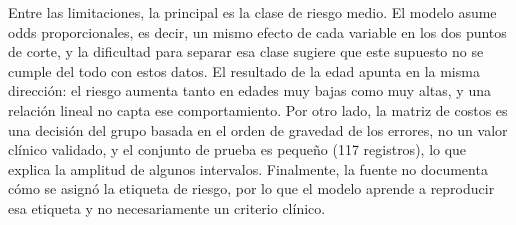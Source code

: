 Entre las limitaciones, la principal es la clase de riesgo medio. El modelo
asume odds proporcionales, es decir, un mismo efecto de cada variable en los
dos puntos de corte, y la dificultad para separar esa clase sugiere que este
supuesto no se cumple del todo con estos datos. El resultado de la edad apunta
en la misma dirección: el riesgo aumenta tanto en edades muy bajas como muy
altas, y una relación lineal no capta ese comportamiento. Por otro lado, la
matriz de costos es una decisión del grupo basada en el orden de gravedad de los
errores, no un valor clínico validado, y el conjunto de prueba es pequeño (117
registros), lo que explica la amplitud de algunos intervalos. Finalmente, la
fuente no documenta cómo se asignó la etiqueta de riesgo, por lo que el modelo
aprende a reproducir esa etiqueta y no necesariamente un criterio clínico.
